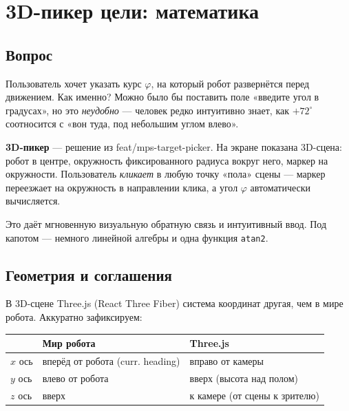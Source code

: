 \chapter{3D-пикер цели: математика}
\label{ch:picker}

\section{Вопрос}

Пользователь хочет указать курс $\varphi$, на который робот развернётся
перед движением. Как именно? Можно было бы поставить поле «введите угол
в градусах», но это \emph{неудобно} --- человек редко интуитивно знает,
как $+72^\circ$ соотносится с «вон туда, под небольшим углом влево».

\begin{ideabox}
\textbf{3D-пикер} --- решение из feat/mps-target-picker. На экране
показана 3D-сцена: робот в центре, окружность фиксированного радиуса
вокруг него, маркер на окружности. Пользователь \emph{кликает} в любую
точку «пола» сцены --- маркер переезжает на окружность в направлении
клика, а угол $\varphi$ автоматически вычисляется.

Это даёт мгновенную визуальную обратную связь и интуитивный ввод.
Под капотом --- немного линейной алгебры и одна функция \texttt{atan2}.
\end{ideabox}

\section{Геометрия и соглашения}

В 3D-сцене Three.js (React Three Fiber) система координат другая, чем
в мире робота. Аккуратно зафиксируем:

\begin{center}
\begin{tabular}{lll}
\toprule
& \textbf{Мир робота} & \textbf{Three.js}\\
\midrule
$x$ ось & вперёд от робота (curr. heading)  & вправо от камеры\\
$y$ ось & влево от робота & вверх (высота над полом)\\
$z$ ось & вверх & к камере (от сцены к зрителю)\\
\bottomrule
\end{tabular}
\end{center}

